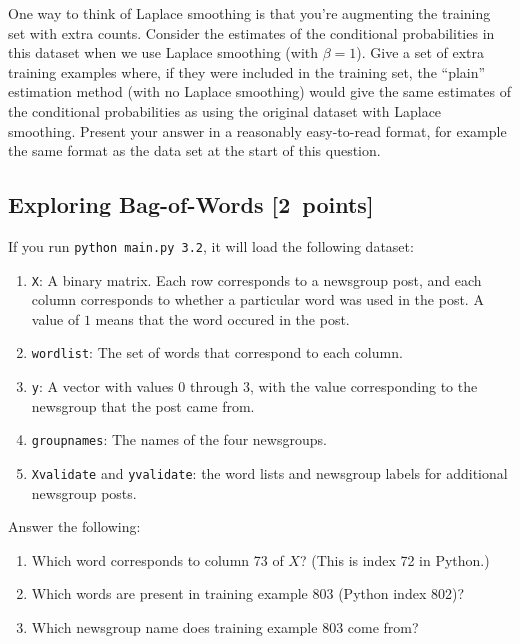 \documentclass{article}
\newcommand{\blu}[1]{{\textcolor{blu}{#1}}}
\let\ask\blu
\newcommand\pts[1]{\textcolor{pointscolour}{[#1~points]}}
\begin{document}
    One way to think of Laplace smoothing is that you're augmenting the training set with extra counts. Consider the estimates of the conditional probabilities in this dataset when we use Laplace smoothing (with $\beta = 1$).
    \ask{Give a set of extra training examples where, if they were included in the training set, the ``plain'' estimation method (with no Laplace smoothing) would give the same estimates of the conditional probabilities as using the original dataset with Laplace smoothing.}
    Present your answer in a reasonably easy-to-read format, for example the same format as the data set at the start of this question.


    \clearpage
    \subsection{Exploring Bag-of-Words \pts{2}}

    If you run \texttt{python main.py 3.2}, it will load the following dataset:
    \begin{enumerate}
        \item \texttt{X}: A binary matrix. Each row corresponds to a newsgroup post, and each column corresponds to whether a particular word was used in the post. A value of $1$ means that the word occured in the post.
        \item \texttt{wordlist}: The set of words that correspond to each column.
        \item \texttt{y}: A vector with values $0$ through $3$, with the value corresponding to the newsgroup that the post came from.
        \item \texttt{groupnames}: The names of the four newsgroups.
        \item \texttt{Xvalidate} and \texttt{yvalidate}: the word lists and newsgroup labels for additional newsgroup posts.
    \end{enumerate}
    \ask{Answer the following}:
    \begin{enumerate}
        \item Which word corresponds to column 73 of $X$? (This is index 72 in Python.)
        \item Which words are present in training example 803 (Python index 802)?
        \item Which newsgroup name does training example 803 come from?
    \end{enumerate}
\end{document}

